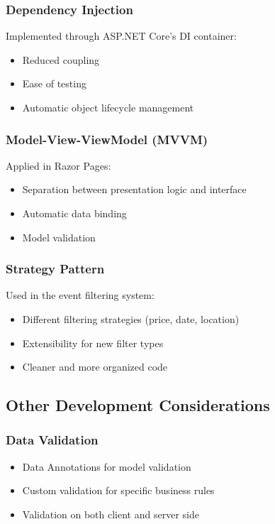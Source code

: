 \documentclass[12pt,a4paper]{article}
\begin{document}
\subsubsection{Dependency Injection}
Implemented through ASP.NET Core's DI container:
\begin{itemize}
    \item Reduced coupling
    \item Ease of testing
    \item Automatic object lifecycle management
\end{itemize}

\subsubsection{Model-View-ViewModel (MVVM)}
Applied in Razor Pages:
\begin{itemize}
    \item Separation between presentation logic and interface
    \item Automatic data binding
    \item Model validation
\end{itemize}

\subsubsection{Strategy Pattern}
Used in the event filtering system:
\begin{itemize}
    \item Different filtering strategies (price, date, location)
    \item Extensibility for new filter types
    \item Cleaner and more organized code
\end{itemize}

\subsection{Other Development Considerations}

\subsubsection{Data Validation}
\begin{itemize}
    \item Data Annotations for model validation
    \item Custom validation for specific business rules
    \item Validation on both client and server side
\end{itemize}
\end{document}
